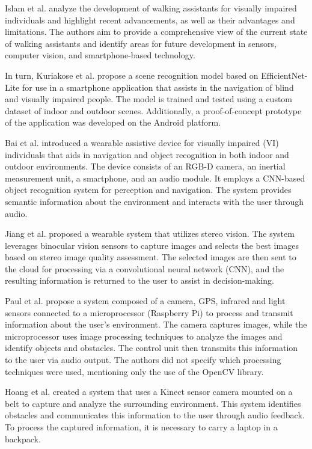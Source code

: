\documentclass[preprint,12pt]{elsarticle}
\begin{document}
Islam et al. \cite{islam2019} analyze the development of walking assistants for visually impaired individuals and highlight recent advancements, as well as their advantages and limitations. The authors aim to provide a comprehensive view of the current state of walking assistants and identify areas for future development in sensors, computer vision, and smartphone-based technology.

In turn, Kuriakose et al. \cite{kuriakose2021} propose a scene recognition model based on EfficientNet-Lite for use in a smartphone application that assists in the navigation of blind and visually impaired people. The model is trained and tested using a custom dataset of indoor and outdoor scenes. Additionally, a proof-of-concept prototype of the application was developed on the Android platform.

Bai et al. \cite{bai2019} introduced a wearable assistive device for visually impaired (VI) individuals that aids in navigation and object recognition in both indoor and outdoor environments. The device consists of an RGB-D camera, an inertial measurement unit, a smartphone, and an audio module. It employs a CNN-based object recognition system for perception and navigation. The system provides semantic information about the environment and interacts with the user through audio.

Jiang et al. \cite{jiang2019} proposed a wearable system that utilizes stereo vision. The system leverages binocular vision sensors to capture images and selects the best images based on stereo image quality assessment. The selected images are then sent to the cloud for processing via a convolutional neural network (CNN), and the resulting information is returned to the user to assist in decision-making.

Paul et al. \cite{joe2019} propose a system composed of a camera, GPS, infrared and light sensors connected to a microprocessor (Raspberry Pi) to process and transmit information about the user's environment. The camera captures images, while the microprocessor uses image processing techniques to analyze the images and identify objects and obstacles. The control unit then transmits this information to the user via audio output. The authors did not specify which processing techniques were used, mentioning only the use of the OpenCV library.

Hoang et al. \cite{hoang2017} created a system that uses a Kinect sensor camera mounted on a belt to capture and analyze the surrounding environment. This system identifies obstacles and communicates this information to the user through audio feedback. To process the captured information, it is necessary to carry a laptop in a backpack.
\end{document}
